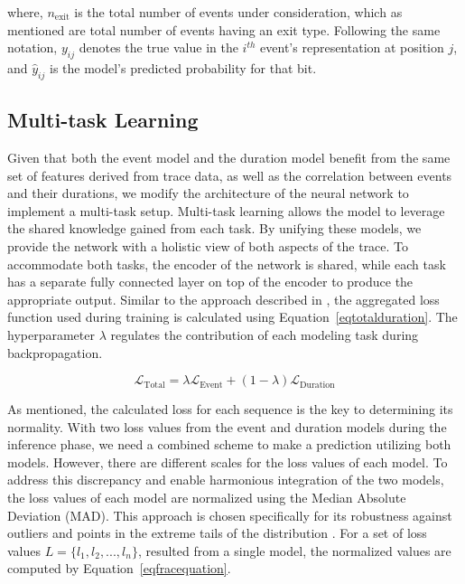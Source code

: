 \documentclass[preprint,12pt]{elsarticle}
\begin{document}
where, $n_{\text{exit}}$ is the total number of events under consideration, which as mentioned are total number of events having an exit type. Following the same notation, \(y_{ij}\) denotes the true value in the \(i^{th}\) event's representation at position \(j\), and \(\hat{y}_{ij}\) is the model's predicted probability for that bit.


\subsection{Multi-task Learning}

Given that both the event model and the duration model benefit from the same set of features derived from trace data, as well as the correlation between events and their durations, we modify the architecture of the neural network to implement a multi-task setup. Multi-task learning allows the model to leverage the shared knowledge gained from each task. By unifying these models, we provide the network with a holistic view of both aspects of the trace. To accommodate both tasks, the encoder of the network is shared, while each task has a separate fully connected layer on top of the encoder to produce the appropriate output. Similar to the approach described in \cite{jang2021bpm_mt}, the aggregated loss function used during training is calculated using Equation~\ref{eqtotalduration}. The hyperparameter $\lambda$ regulates the contribution of each modeling task during backpropagation.

\begin{equation}\label{eqtotalduration}
\mathcal{L}_{\text{Total}} = \lambda \mathcal{L}_{\text{Event}} + (1 - \lambda) \mathcal{L}_{\text{Duration}}
\end{equation}

As mentioned, the calculated loss for each sequence is the key to determining its normality. With two loss values from the event and duration models during the inference phase, we need a combined scheme to make a prediction utilizing both models. However, there are different scales for the loss values of each model. To address this discrepancy and enable harmonious integration of the two models, the loss values of each model are normalized using the Median Absolute Deviation (MAD). This approach is chosen specifically for its robustness against outliers and points in the extreme tails of the distribution \cite{jain2005score}. For a set of loss values $L = \{l_1, l_2, ..., l_n\}$, resulted from a single model, the normalized values are computed by Equation~\ref{eqfracequation}.
\end{document}

